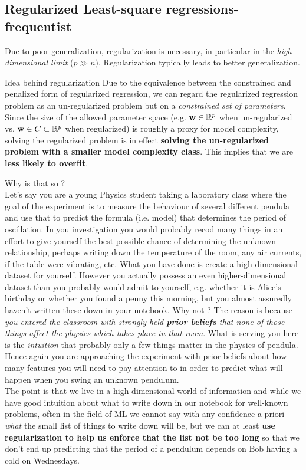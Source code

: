 \subsection{Regularized Least-square regressions-frequentist}
\label{subsec:lregRegularization}
Due to poor generalization, regularization is necessary, in particular  in the \emph{high-dimensional limit} ($p\gg n$). Regularization typically leads to better generalization. 
\begin{mybox}{Idea behind regularization}
	Due to the equivalence between the constrained and penalized form of regularized regression, we can regard the regularized regression problem as an un-regularized problem but on a \emph{constrained set of parameters}. Since the size of the allowed parameter space (e.g. $\mathbf{w} \in \mathbb{R}^p$ when un-regularized vs. $\mathbf{w} \in C \subset \mathbb{R}^p$ when regularized) is roughly a proxy for model complexity, solving the regularized problem is in effect \textbf{solving the un-regularized problem with a smaller model complexity class}. This implies that we are \textbf{less likely to overfit}.
\end{mybox}
Why is that so ?\\
Let's say you are a young Physics student taking a laboratory class where the goal of the experiment is to measure the behaviour of several different pendula and use that to predict the formula (i.e. model) that determines the period of oscillation. In you investigation you would probably recod many things in an effort to give yourself the best possible chance of determining the unknown relationship, perhaps writing down the temperature of the room, any air currents, if the table were vibrating, etc. What you have done is create a high-dimensional dataset for yourself. However you actually possess an even higher-dimensional dataset than you probably would admit to yourself, e.g. whether it is Alice's birthday or whether you found a penny this morning, but you almost assuredly haven't written these down in your notebook. Why not ? The reason is because \emph{you entered the classroom with strongly held \textbf{prior beliefs} that none of those things affect the physics which takes place in that room}. What is serving you here is the \emph{intuition} that probably only a few things matter in the physics of pendula. Hence again you are approaching the experiment with prior beliefs about how many features you will need to pay attention to in order to predict what will happen when you swing an unknown pendulum.\\
The point is that we live in a high-dimensional world of information and while we have good intuition about what to write down in our notebook for well-known problems, often in the field of ML we cannot say with any confidence a priori \emph{what} the small list of things to write down will be, but we can at least \textbf{use regularization to help us enforce that the list not be too long} so that we don't end up predicting that the period of a pendulum depends on Bob having a cold on Wednesdays.

